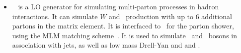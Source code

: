 \begin{itemize}
    \item \alpgen~\cite{alpgen} is a LO generator for simulating multi-parton
    processes in hadron interactions. It can simulate $W$ and \Z\ production
    with up to 6 additional partons in the matrix element. It is interfaced to
    \herwig\ for the parton shower, using the MLM matching
    scheme~\cite{Mangano2002343}. It is used to simulate \W\ and \Z\ bosons in
    association with jets, as well as low mass Drell-Yan and \Wg and \Zg.



\end{itemize}

